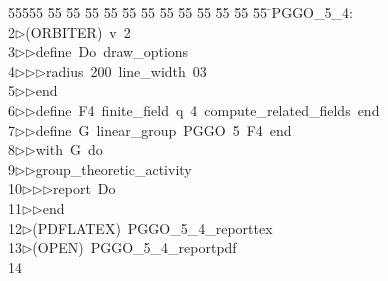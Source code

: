 %
%
\begin{tabbing}
55555 \= 55 \= 55 \= 55 \= 55 \= 55 \= 55 \= 55 \= 55 \= 55 \= 55 \= 55 \= 55 \= \>PGGO\_5\_4:\\[0pt]
2\>$\triangleright$\>(ORBITER)\ v\ 2\ \\[0pt]
3\>$\triangleright$\>$\triangleright$\>define\ Do\ draw\_options\ \\[0pt]
4\>$\triangleright$\>$\triangleright$\>$\triangleright$\>radius\ 200\ line\_width\ 03\ \\[0pt]
5\>$\triangleright$\>$\triangleright$\>end\ \\[0pt]
6\>$\triangleright$\>$\triangleright$\>define\ F4\ finite\_field\ q\ 4\ compute\_related\_fields\ end\ \\[0pt]
7\>$\triangleright$\>$\triangleright$\>define\ G\ linear\_group\ PGGO\ 5\ F4\ end\ \\[0pt]
8\>$\triangleright$\>$\triangleright$\>with\ G\ do\ \\[0pt]
9\>$\triangleright$\>$\triangleright$\>group\_theoretic\_activity\ \\[0pt]
10\>$\triangleright$\>$\triangleright$\>$\triangleright$\>report\ Do\ \\[0pt]
11\>$\triangleright$\>$\triangleright$\>end\\[0pt]
12\>$\triangleright$\>(PDFLATEX)\ PGGO\_5\_4\_reporttex\\[0pt]
13\>$\triangleright$\>(OPEN)\ PGGO\_5\_4\_reportpdf\\[0pt]
14\>\end{tabbing}
